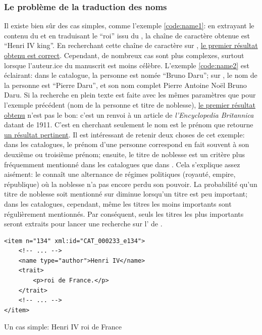 \subsubsection{Le problème de la traduction des noms}
Il existe bien sûr des cas simples, comme l'exemple \ref{code:name1}: en extrayant le contenu du \tname et en traduisant le \enquote{roi} issu du \ttrait{}, la chaîne de caractère obtenue est \enquote{Henri IV king}. En recherchant cette chaîne de caractère sur \wkd{}, \href{https://www.wikidata.org/w/index.php?search=Henri+IV+king\&title=Special:Search\&profile=advanced\&fulltext=1\&ns0=1\&ns120=1}{le premier résultat obtenu est correct}. Cependant, de nombreux cas sont plus complexes, surtout lorsque l'auteur.ice du manuscrit est moins célèbre. L'exemple \ref{code:name2} est éclairant: dans le catalogue, la personne est nomée \enquote{Bruno Daru}; sur \wkd{}, le nom de la personne est \enquote{Pierre Daru}, et son nom complet {Pierre Antoine Noël Bruno Daru}. Si la recherche en plein texte est faite avec les mêmes paramètres que pour l'exemple précédent (nom de la personne et titre de noblesse), \href{https://www.wikidata.org/w/index.php?search=bruno+daru+count&title=Special:Search&profile=advanced&fulltext=1&ns0=1&ns120=1}{le premier résultat obtenu} n'est pas le bon: c'est un renvoi à un article de \textit{l'Encyclopedia Britannica} datant de 1911. C'est en cherchant seulement le nom est le prénom que \wkd{} retourne \href{https://www.wikidata.org/w/index.php?search=bruno+daru&title=Special:Search&profile=advanced&fulltext=1&ns0=1&ns120=1}{un résultat pertinent}. Il est intéressant de retenir deux choses de cet exemple: dans les catalogues, le prénom d'une personne correspond en fait souvent à son deuxième ou troisième prénom; ensuite, le titre de noblesse est un critère plus fréquemment mentionné dans les catalogues que dans \wkd{}. Cela s'explique assez aisément: le  connaît une alternance de régimes politiques (royauté, empire, république) où la noblesse n'a pas encore perdu son pouvoir. La probabilité qu'un titre de noblesse soit mentionné sur \wkd{} diminue lorsqu'un titre est peu important; dans les catalogues, cependant, même les titres les moins importants sont régulièrement mentionnés. Par conséquent, seuls les titres les plus importants seront extraits pour lancer une recherche sur l'\api{} de \wkd{}.

\begin{listing}
	\begin{verbatim}
<item n="134" xml:id="CAT_000233_e134">
	<!-- ... -->
	<name type="author">Henri IV</name>
	<trait>
		<p>roi de France.</p>
	</trait>
	<!-- ... -->
</item>
	\end{verbatim}
	\caption{Un cas simple: Henri IV roi de France}
	\label{code:name1}
\end{listing}

